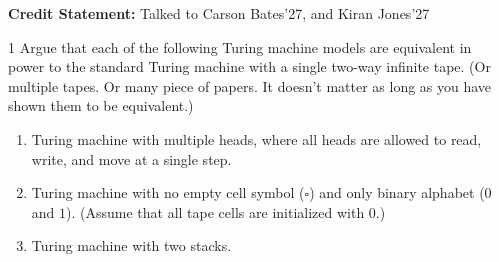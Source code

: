 \documentclass[12pt]{article}
\begin{document}


\textbf{Credit Statement:} Talked to Carson Bates'27, and Kiran Jones'27

\begin{problem}{1}
    Argue that each of the following Turing machine models are equivalent in power to the standard Turing machine with a single two-way infinite tape. (Or multiple tapes. Or many piece of papers. It doesn’t matter as long as you have shown them to be equivalent.)
    \begin{enumerate}
        \item Turing machine with multiple heads, where all heads are allowed to read, write, and move at a single step.
        \item  Turing machine with no empty cell symbol ($\square$) and only binary alphabet ($0$ and $1$). (Assume that all tape cells are initialized with $0$.)
        \item Turing machine with two stacks.
    \end{enumerate}
\end{problem}
\end{document}
